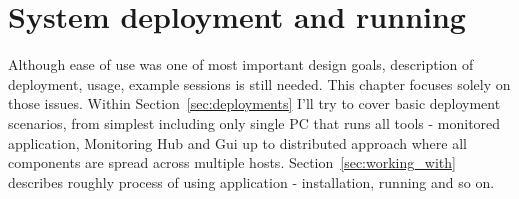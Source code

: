  
%


\chapter{System deployment and running}
\label{cha:deployment}

Although ease of use was one of most important design goals, description of deployment, usage, example sessions is still needed. This chapter focuses solely on those issues. Within Section~\ref{sec:deployments} I\rq{}ll try to cover basic deployment scenarios, from simplest including only single PC that runs all tools - monitored application, Monitoring Hub and Gui up to distributed approach where all components are spread across multiple hosts. Section~\ref{sec:working_with} describes roughly process of using application - installation, running and so on.





%



